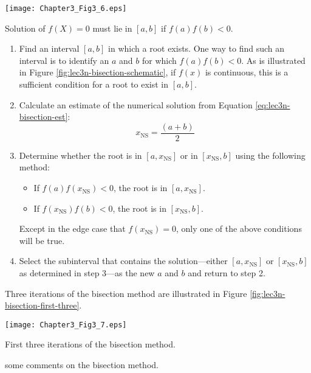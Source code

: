 \begin{marginfigure}
\texttt{[image: Chapter3\_Fig3\_6.eps]}
\caption{Solution of $f(X)=0$ must lie in $[a,b]$ if $f(a)f(b)<0$.}
\label{fig:lec3n-bisection-schematic}
\end{marginfigure}
\begin{enumerate}
\item Find an interval $[a,b]$ in which a root exists.  One way to find such an interval is to identify an $a$ and $b$ for which $f(a)f(b)<0$.  As is illustrated in Figure \ref{fig:lec3n-bisection-schematic}, if $f(x)$ is continuous, this is a sufficient condition for a root to exist in $[a,b]$.

\item Calculate an estimate of the numerical solution from Equation \ref{eq:lec3n-bisection-est}:
\begin{equation}
x_{\text{NS}} = \frac{(a+b)}{2}
\label{eq:lec3n-bisection-est}
\end{equation}

\item Determine whether the root is in $[a,x_{\text{NS}}]$ or in $[x_{\text{NS}},b]$ using the following method:
\begin{itemize}
\item If $f(a)f(x_{\text{NS}}) < 0$, the root is in $[a,x_{\text{NS}}]$.
\item If $f(x_{\text{NS}})f(b) < 0$, the root is in $[x_{\text{NS}},b]$.
\end{itemize}
Except in the edge case that $f(x_{\text{NS}})=0$, only one of the above conditions will be true.

\item Select the subinterval that contains the solution---either $[a,x_{\text{NS}}]$ or $[x_{\text{NS}},b]$ as determined in step 3---as the new $a$ and $b$ and return to step 2.
\end{enumerate}
Three iterations of the bisection method are illustrated in Figure \ref{fig:lec3n-bisection-first-three}.
\begin{marginfigure}
\texttt{[image: Chapter3\_Fig3\_7.eps]}
\caption{First three iterations of the bisection method.}
\label{fig:lec3n-bisection-first-three}
\end{marginfigure}

 some comments on the bisection method.

